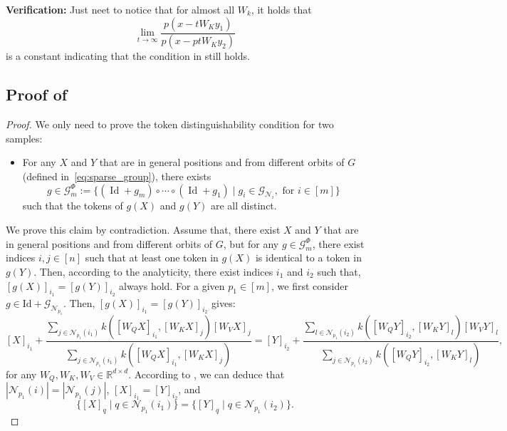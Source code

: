 \documentclass{article}
\begin{document}
\begin{itemize}
    \textbf{Verification:} Just neet to notice that for almost all $W_k$, it holds that
    \begin{equation}
        \lim_{t\to\infty} \frac{p(x-tW_Ky_1)}{p(x-ptW_Ky_2)}
    \end{equation}
    is a constant indicating that the condition in  still holds.
\end{itemize}

\subsection{Proof of }
\begin{proof}
    We only need to prove the token distinguishability condition for two samples:
    \begin{itemize}
        \item For any $X$ and $Y$ that are in general positions and from different orbits of $G$(defined in~\eqref{eq:sparse_group}), there exists
    \begin{equation}
     g\in \mathcal G_m^\Phi:=\{(\operatorname{Id}+g_m)\circ \cdots \circ (\operatorname{Id}+g_1)\mid g_i\in\mathcal G_{\mathcal N_i}, \text{ for } i \in [m]\}
    \end{equation}
     such that the tokens of $g(X)$ and $g(Y)$ are all distinct.
    \end{itemize}
    We prove this claim by contradiction. Assume that, there exist $X$ and $Y$ that are in general positions and from different orbits of $G$, but for any $g\in \mathcal G_m^\Phi$, there exist indices $i,j\in [n]$ such that at least one token in $g(X)$ is identical to a token in $g(Y)$.
    Then, according to the analyticity, there exist indices $i_1$ and $i_2$ such that, $[g(X)]_{i_1}=[g(Y)]_{i_2}$ always hold. For a given $p_1\in [m]$, we first consider $g\in\mathrm{Id} +\mathcal G_{\mathcal N_{p_1}}$. Then, $[g(X)]_{i_1}=[g(Y)]_{i_2}$ gives:
    \begin{equation}
        \label{eq:prop2_equal_atten}
[X]_{i_1}+\frac{\sum_{j\in\mathcal N_{p_1}(i_1)} k([W_QX]_{i_1},[W_KX]_j)[W_VX]_j}{\sum_{j\in\mathcal N_{p_1}(i_1)} k([W_QX]_{i_1},[W_KX]_j)}= [Y]_{i_2}+\frac{\sum_{l\in\mathcal N_{p_1}(i_2)} k([W_QY]_{i_2},[W_KY]_l)[W_VY]_l}{\sum_{j\in\mathcal N_{p_1}(i_2)} k([W_QY]_{i_2},[W_KY]_l)},
    \end{equation}
    for any $W_Q, W_K, W_V\in\mathbb{R}^{d\times d}$. According to , we can deduce that $|\mathcal N_{p_1}(i)|=|\mathcal N_{p_1}(j)|$, $[X]_{i_1}=[Y]_{i_2}$, and 
    \begin{equation}
        \{[X]_q\mid q\in \mathcal N_{p_1}(i_1)\}=\{[Y]_q\mid q\in \mathcal N_{p_1}(i_2)\}.
    \end{equation}
    

\end{proof}
\end{document}
